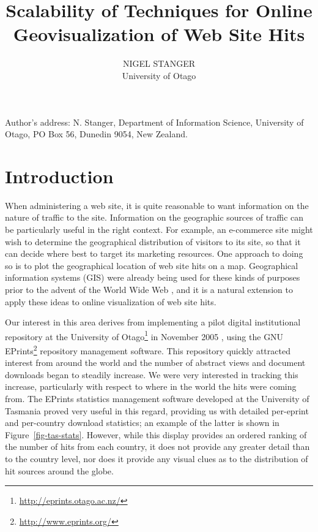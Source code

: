 \documentclass[acmnow]{acmtrans2m}
\title{Scalability of Techniques for Online Geovisualization of Web Site Hits}
\author{NIGEL STANGER \\ University of Otago}
\begin{document}


            
\begin{bottomstuff} 
Author's address: N. Stanger, Department of Information Science,
University of Otago, PO Box 56, Dunedin 9054, New Zealand.
\end{bottomstuff}
            
\maketitle


\section{Introduction}
\label{sec-introduction}

When administering a web site, it is quite reasonable to want
information on the nature of traffic to the site. Information on the
geographic sources of traffic can be particularly useful in the right
context. For example, an e-commerce site might wish to determine the
geographical distribution of visitors to its site, so that it can decide
where best to target its marketing resources. One approach to doing so
is to plot the geographical location of web site hits on a map.
Geographical information systems (GIS) were already being used for these
kinds of purposes prior to the advent of the World Wide Web
\cite{Beau-JR-1991-GIS}, and it is a natural extension to apply these
ideas to online visualization of web site hits.

Our interest in this area derives from implementing a pilot digital
institutional repository at the University of
Otago\footnote{\url{http://eprints.otago.ac.nz/}} in November 2005
\cite{Stan-N-2006-running}, using the GNU
EPrints\footnote{\url{http://www.eprints.org/}} repository management
software. This repository quickly attracted interest from around the
world and the number of abstract views and document downloads began to
steadily increase. We were very interested in tracking this increase,
particularly with respect to where in the world the hits were coming
from. The EPrints statistics management software developed at the
University of Tasmania \cite{Sale-A-2006-stats} proved very useful in
this regard, providing us with detailed per-eprint and per-country
download statistics; an example of the latter is shown in
Figure~\ref{fig-tas-stats}. However, while this display provides an
ordered ranking of the number of hits from each country, it does not
provide any greater detail than to the country level, nor does it
provide any visual clues as to the distribution of hit sources around
the globe.
\end{document}

